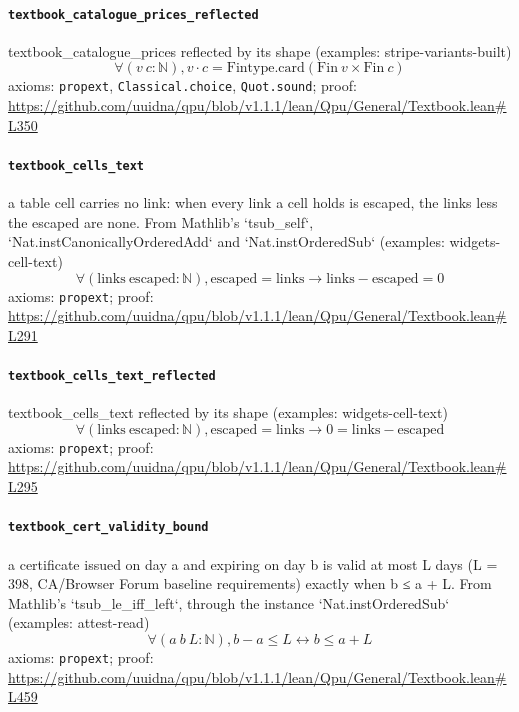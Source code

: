 \documentclass[11pt]{article}
\begin{document}
\paragraph{\texttt{textbook\_catalogue\_prices\_reflected}}
textbook\_catalogue\_prices reflected by its shape (examples: stripe-variants-built)
\[ \forall (v\ c : \mathbb{N}), v \cdot c = \mathrm{Fintype.card} (\mathrm{Fin}\ v \times \mathrm{Fin}\ c) \]
\noindent axioms: \texttt{propext}, \texttt{Classical.choice}, \texttt{Quot.sound}; proof: \url{https://github.com/uuidna/qpu/blob/v1.1.1/lean/Qpu/General/Textbook.lean\#L350}

\paragraph{\texttt{textbook\_cells\_text}}
a table cell carries no link: when every link a cell holds is escaped, the links less the escaped are none. From Mathlib's `tsub\_self`, `Nat.instCanonicallyOrderedAdd` and `Nat.instOrderedSub` (examples: widgets-cell-text)
\[ \forall (\mathrm{links}\ \mathrm{escaped} : \mathbb{N}), \mathrm{escaped} = \mathrm{links} \to \mathrm{links} - \mathrm{escaped} = 0 \]
\noindent axioms: \texttt{propext}; proof: \url{https://github.com/uuidna/qpu/blob/v1.1.1/lean/Qpu/General/Textbook.lean\#L291}

\paragraph{\texttt{textbook\_cells\_text\_reflected}}
textbook\_cells\_text reflected by its shape (examples: widgets-cell-text)
\[ \forall (\mathrm{links}\ \mathrm{escaped} : \mathbb{N}), \mathrm{escaped} = \mathrm{links} \to 0 = \mathrm{links} - \mathrm{escaped} \]
\noindent axioms: \texttt{propext}; proof: \url{https://github.com/uuidna/qpu/blob/v1.1.1/lean/Qpu/General/Textbook.lean\#L295}

\paragraph{\texttt{textbook\_cert\_validity\_bound}}
a certificate issued on day a and expiring on day b is valid at most L days (L = 398, CA/Browser Forum baseline requirements) exactly when b ≤ a + L. From Mathlib's `tsub\_le\_iff\_left`, through the instance `Nat.instOrderedSub` (examples: attest-read)
\[ \forall (a\ b\ L : \mathbb{N}), b - a \le L \leftrightarrow b \le a + L \]
\noindent axioms: \texttt{propext}; proof: \url{https://github.com/uuidna/qpu/blob/v1.1.1/lean/Qpu/General/Textbook.lean\#L459}
\end{document}
